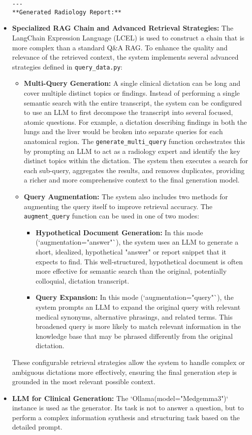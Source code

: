 \begin{itemize}
\begin{verbatim}
---
**Generated Radiology Report:**
    \end{verbatim}
    \item \textbf{Specialized RAG Chain and Advanced Retrieval Strategies:} The LangChain Expression Language (LCEL) is used to construct a chain that is more complex than a standard Q\&A RAG. To enhance the quality and relevance of the retrieved context, the system implements several advanced strategies defined in \texttt{query\_data.py}:
        \begin{itemize}
            \item \textbf{Multi-Query Generation:} A single clinical dictation can be long and cover multiple distinct topics or findings. Instead of performing a single semantic search with the entire transcript, the system can be configured to use an LLM to first decompose the transcript into several focused, atomic questions. For example, a dictation describing findings in both the lungs and the liver would be broken into separate queries for each anatomical region. The \texttt{generate\_multi\_query} function orchestrates this by prompting an LLM to act as a radiology expert and identify the key distinct topics within the dictation. The system then executes a search for each sub-query, aggregates the results, and removes duplicates, providing a richer and more comprehensive context to the final generation model.
            \item \textbf{Query Augmentation:} The system also includes two methods for augmenting the query itself to improve retrieval accuracy. The \texttt{augment\_query} function can be used in one of two modes:
                \begin{itemize}
                    \item \textbf{Hypothetical Document Generation:} In this mode (`augmentation="answer"`), the system uses an LLM to generate a short, idealized, hypothetical "answer" or report snippet that it expects to find. This well-structured, hypothetical document is often more effective for semantic search than the original, potentially colloquial, dictation transcript.
                    \item \textbf{Query Expansion:} In this mode (`augmentation="query"`), the system prompts an LLM to expand the original query with relevant medical synonyms, alternative phrasings, and related terms. This broadened query is more likely to match relevant information in the knowledge base that may be phrased differently from the original dictation.
                \end{itemize}
        \end{itemize}
        These configurable retrieval strategies allow the system to handle complex or ambiguous dictations more effectively, ensuring the final generation step is grounded in the most relevant possible context.
    \item \textbf{LLM for Clinical Generation:} The `Ollama(model="Medgemma3")` instance is used as the generator. Its task is not to answer a question, but to perform a complex information synthesis and structuring task based on the detailed prompt.
\end{itemize}

